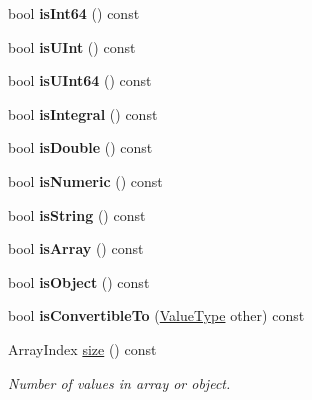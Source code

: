 \begin{DoxyCompactItemize}
\item 
\mbox{\label{classJson_1_1Value_a4a81fb3c3acdbb68b2e2f30836a4f53e}} 
bool {\bfseries is\+Int64} () const
\item 
\mbox{\label{classJson_1_1Value_abdda463d3269015f883587349726cfbc}} 
bool {\bfseries is\+U\+Int} () const
\item 
\mbox{\label{classJson_1_1Value_a883576e35cb03a785258edb56777a2de}} 
bool {\bfseries is\+U\+Int64} () const
\item 
\mbox{\label{classJson_1_1Value_ab6798954f6e80281cf22708ef45198a7}} 
bool {\bfseries is\+Integral} () const
\item 
\mbox{\label{classJson_1_1Value_a4a2e2a790e19a1c09fc5dd12d7ad47b5}} 
bool {\bfseries is\+Double} () const
\item 
\mbox{\label{classJson_1_1Value_af961a000cd203c895e44c195ab39b866}} 
bool {\bfseries is\+Numeric} () const
\item 
\mbox{\label{classJson_1_1Value_a71e1f82cf1c3eaf969d400dcffb163a6}} 
bool {\bfseries is\+String} () const
\item 
\mbox{\label{classJson_1_1Value_a1627eb9d6568d6d0252fa8bb711c0a59}} 
bool {\bfseries is\+Array} () const
\item 
\mbox{\label{classJson_1_1Value_a8cf96c0f2a552051fcfc78ffee60e037}} 
bool {\bfseries is\+Object} () const
\item 
\mbox{\label{classJson_1_1Value_af1ee6be27a96a7d12128efdd60deb54d}} 
bool {\bfseries is\+Convertible\+To} (\hyperlink{namespaceJson_a7d654b75c16a57007925868e38212b4e}{Value\+Type} other) const
\item 
\mbox{\label{classJson_1_1Value_a0ec2808e1d7efa4e9fad938d6667be44}} 
Array\+Index \hyperlink{classJson_1_1Value_a0ec2808e1d7efa4e9fad938d6667be44}{size} () const
\begin{DoxyCompactList}\small\item\em Number of values in array or object. \end{DoxyCompactList}\item 

\end{DoxyCompactItemize}
